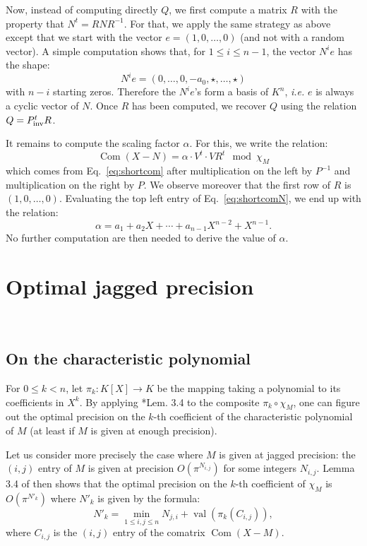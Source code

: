 \documentclass{sig-alternate-05-2015}
\DeclareMathOperator{\val}{val}
\DeclareMathOperator{\com}{Com}
\newcommand{\inv}{\text{\rm inv}}
\def\todo#1{\ \!\!{\color{red} #1}}
\begin{document}
Now, instead of computing directly $Q$, we first compute a matrix $R$ 
with the property that $N^t = R N R^{-1}$. For that, we apply the same
strategy as above except that we start with the vector $e = (1, 0, 
\ldots, 0)$ (and not with a random vector). A simple computation shows
that, for $1 \leq i \leq n{-}1$, the vector $N^i e$ has the shape:
$$N^i e = (0, \ldots, 0, -a_0, \star, \ldots, \star)$$
with $n{-}i$ starting zeros. Therefore the $N^i e$'s form a basis of
$K^n$, \emph{i.e.} $e$ is always a cyclic vector of $N$. Once $R$ has
been computed, we recover $Q$ using the relation $Q = P_\inv^t R$.

It remains to compute the scaling factor $\alpha$. For this, we write
the relation:
\begin{equation}
\label{eq:shortcomN}
\com(X{-}N) = \alpha \cdot V^t \cdot V R^t \mod \chi_M
\end{equation}
which comes from Eq.~\eqref{eq:shortcom} after multiplication on the 
left by $P^{-1}$ and multiplication on the right by $P$. We observe
moreover that the first row of $R$ is $(1, 0, \ldots, 0)$. Evaluating
the top left entry of Eq.~\eqref{eq:shortcomN}, we end up with the 
relation:
$$\alpha = a_1 + a_2 X + \cdots + a_{n-1} X^{n-2} + X^{n-1}.$$
No further computation are then needed to derive the value of $\alpha$.

\section{Optimal jagged precision}
\label{sec:optjagged}

\todo{Write a small introduction}

\subsection{On the characteristic polynomial}

For $0 \leq k < n$, let $\pi_k : K[X] \to K$ be the mapping taking a 
polynomial to its coefficients in $X^k$. By applying 
\cite{caruso-roe-vaccon:14a}*{Lem. 3.4} to the composite $\pi_k 
\circ \chi_M$, one can figure out the optimal precision on the
$k$-th coefficient of the characteristic polynomial of $M$ (at
least if $M$ is given at enough precision).

Let us consider more precisely the case where $M$ is given at 
jagged precision: the $(i,j)$ entry of $M$ is given at precision 
$O(\pi^{N_{i,j}})$ for some integers $N_{i,j}$. 
Lemma 3.4 of \cite{caruso-roe-vaccon:14a} then shows that
the optimal precision on the $k$-th coefficient of $\chi_M$ is 
$O(\pi^{N'_k})$ where $N'_k$ is given by the formula:
\begin{equation}
\label{eq:optjagged}
N'_k = \min_{1 \leq i, j\leq n} N_{j,i} + \val(\pi_k(C_{i,j})),
\end{equation}
where $C_{i,j}$ is the $(i,j)$ entry of the comatrix $\com(X{-}M)$.
\end{document}
